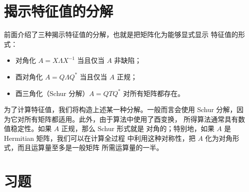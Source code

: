 \documentclass[UTF8,fontset=none,12pt]{ctexart}
\begin{document}
\section*{揭示特征值的分解}

前面介绍了三种揭示特征值的分解，也就是把矩阵化为能够显式显示
特征值的形式：

\begin{itemize}[leftmargin=2.5em]
    \item 对角化 $A=X\Lambda X^{-1}$ 当且仅当 $A$ 非缺陷；
    \item 酉对角化 $A=Q\Lambda Q^*$ 当且仅当 $A$ 正规；
    \item 酉三角化（Schur 分解）$A=QTQ^*$ 对所有矩阵都存在。
\end{itemize}

为了计算特征值，我们将构造上述某一种分解。一般而言会使用 Schur
分解，因为它对所有矩阵都适用。此外，由于算法中使用了酉变换，
所得算法通常具有数值稳定性。如果 $A$ 正规，那么 Schur 形式就是
对角的；特别地，如果 $A$ 是 Hermitian 矩阵，我们可以在计算全过程
中利用这种对称性，把 $A$ 化为对角形式，而且运算量至多是一般矩阵
所需运算量的一半。

\section*{习题}
\end{document}
